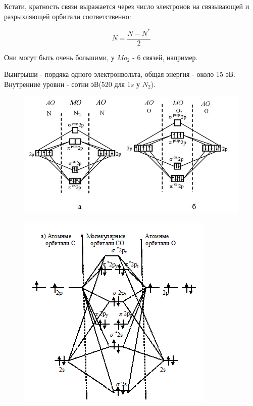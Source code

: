 \documentclass[11pt]{article}
\begin{document}
Кстати, кратность связи выражается через число электронов на связывающей и разрыхляющей орбитали соответственно:

$$N = \frac{N-N^*}2$$

Они могут быть очень большими, у $Mo_2$ - 6 связей, например.

Выигрыши - пордяка одного электронвольта, общая энергия - около 15 эВ. Внутренние уровни - сотни эВ(520 для $1s$ у $N_2$).

\begin{figure}[htp]
\centering
\includegraphics[scale=1.00]{n2o2-mo.jpg}
\end{figure}

\begin{figure}[htp]
\centering
\includegraphics[scale=1.00]{co-mo.png}
\caption{}
\label{}
\end{figure}
\end{document}
